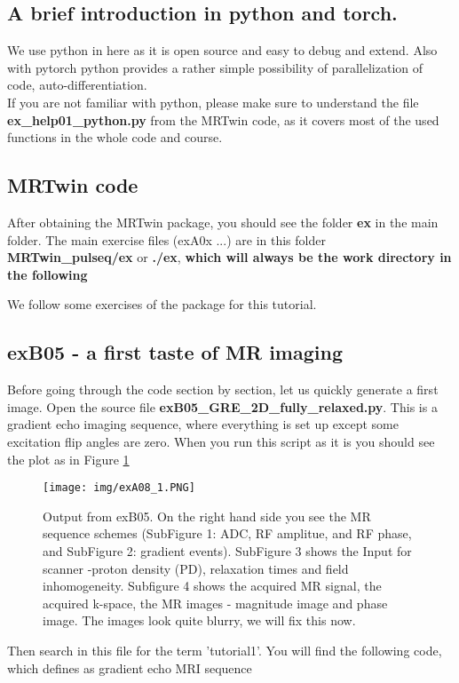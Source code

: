 \documentclass[a4paper,12pt]{extarticle}
\begin{document}
\subsection{A brief introduction in python and torch. }
We use python in here as it is open source and easy to debug and extend. Also with pytorch python provides a rather simple possibility of parallelization of code, auto-differentiation. \\
If you are not familiar with python, please make sure to understand the file \textbf{ex\_help01\_python.py} from the MRTwin code, as it covers most of the used functions in the whole code and course.

\subsection{MRTwin code}
After obtaining the MRTwin package, you should see the folder \textbf{ex} in the main folder.
The main exercise files (exA0x ...) are in this folder \textbf{MRTwin\_pulseq/ex} or \textbf{./ex}, \textbf{which will always be the work directory in the following} 

We follow some exercises of the package for this tutorial.

\subsection{exB05 - a first taste of MR imaging}
Before going through the code section by section, let us quickly generate a first image. Open the source file \textbf{exB05\_GRE\_2D\_fully\_relaxed.py}. This is a gradient echo imaging sequence, where everything is set up except some excitation flip angles are zero. When you run this script as it is you should see the plot as in Figure \ref{fig:exA08_1}

\begin{figure}[!ht] 
\centering
\texttt{[image: img/exA08\_1.PNG]}
\caption{Output from exB05. On the right hand side you see the MR sequence schemes (SubFigure 1: ADC, RF amplitue, and RF phase, and SubFigure 2: gradient events). SubFigure 3 shows the Input for scanner -proton density (PD), relaxation times and field inhomogeneity. Subfigure 4 shows the acquired MR signal, the acquired k-space, the MR images - magnitude image and phase image. The images look quite blurry, we will fix this now. }\label{fig:exA08_1}
\end{figure}

Then search in this file for the term 'tutorial1'. You will find the following code, which defines as gradient echo MRI sequence
\end{document}
